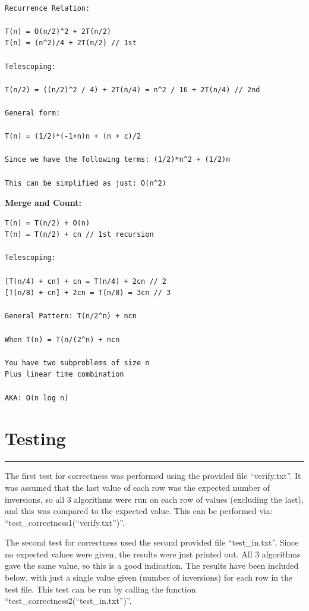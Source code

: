 \documentclass[letterpaper,10pt,titlepage,fleqn]{article}
\begin{document}
\begin{lstlisting}

Recurrence Relation:

T(n) = O(n/2)^2 + 2T(n/2)
T(n) = (n^2)/4 + 2T(n/2) // 1st

Telescoping: 

T(n/2) = ((n/2)^2 / 4) + 2T(n/4) = n^2 / 16 + 2T(n/4) // 2nd

General form:

T(n) = (1/2)*(-1+n)n + (n + c)/2

Since we have the following terms: (1/2)*n^2 + (1/2)n

This can be simplified as just: O(n^2)

\end{lstlisting}

\begin{centering}
\textbf{Merge and Count:}
\end{centering}

\begin{lstlisting}
T(n) = T(n/2) + O(n) 
T(n) = T(n/2) + cn // 1st recursion 

Telescoping:

[T(n/4) + cn] + cn = T(n/4) + 2cn // 2 
[T(n/8) + cn] + 2cn = T(n/8) = 3cn // 3 

General Pattern: T(n/2^n) + ncn

When T(n) = T(n/(2^n) + ncn

You have two subproblems of size n
Plus linear time combination

AKA: O(n log n)
\end{lstlisting}

\section*{Testing}
\hrule
The first test for correctness was performed using the provided file ``verify.txt''. It was assumed that the last value of each row was the expected number of inversions, so all 3 algorithms were run on each row of values (excluding the last), and this was compared to the expected value. This can be performed via: ``test\_correctness1(``verify.txt'')''.

The second test for correctness used the second provided file ``test\_in.txt''. Since no expected values were given, the results were just printed out. All 3 algorithms gave the same value, so this is a good indication. The results have been included below, with just a single value given (number of inversions) for each row in the test file. This test can be run by calling the function ``test\_correctness2(``test\_in.txt'')''.
\end{document}
